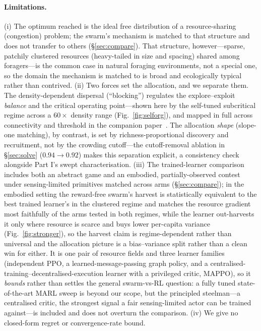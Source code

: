 \documentclass{article}
\begin{document}
\paragraph{Limitations.} (i) The optimum reached is the ideal free distribution of a resource-sharing
(congestion) problem; the swarm's mechanism is matched to that structure and does not transfer to others
(\S\ref{sec:compare}). That structure, however---sparse, patchily clustered resources (heavy-tailed in size and
spacing) shared among foragers---is the common case in natural foraging environments, not a special one, so the
domain the mechanism is matched to is broad and ecologically typical rather than contrived. (ii) Two forces set the allocation, and we separate them. The density-dependent dispersal
(``blocking'') regulates the explore--exploit \emph{balance} and the critical operating point---shown here by
the self-tuned subcritical regime across a $60\times$ density range (Fig.~\ref{fig:selforg}), and mapped in
full across connectivity and threshold in the companion paper~\citep{partI}. The allocation
\emph{shape} (slope-one matching), by contrast, is set by richness-proportional discovery and recruitment, not
by the crowding cutoff---the cutoff-removal ablation in \S\ref{sec:solve} ($0.94\to0.92$) makes this separation
explicit, a consistency check alongside Part I's swept characterisation. (iii) The
trained-learner comparison includes both an abstract game and an embodied, partially-observed contest under
sensing-limited primitives matched across arms (\S\ref{sec:compare}); in the embodied setting the reward-free
swarm's harvest is statistically equivalent to the best trained learner's in the clustered regime and matches
the resource gradient most faithfully of the arms tested in both regimes, while the learner out-harvests it only where resource is
scarce and buys lower per-capita variance (Fig.~\ref{fig:stronger}), so the harvest claim is regime-dependent
rather than universal and the allocation picture is a bias--variance split rather than a clean win for either.
It is one pair of resource fields and three learner families (independent PPO, a learned-message-passing graph
policy, and a centralised-training--decentralised-execution learner with a privileged critic, MAPPO), so it
\emph{bounds} rather than settles the general swarm-vs-RL question: a fully tuned state-of-the-art MARL sweep is
beyond our scope, but the principled steelman---a centralised critic, the strongest signal a fair sensing-limited
actor can be trained against---is included and does not overturn the comparison. (iv) We give no closed-form
regret or convergence-rate bound.
\end{document}
